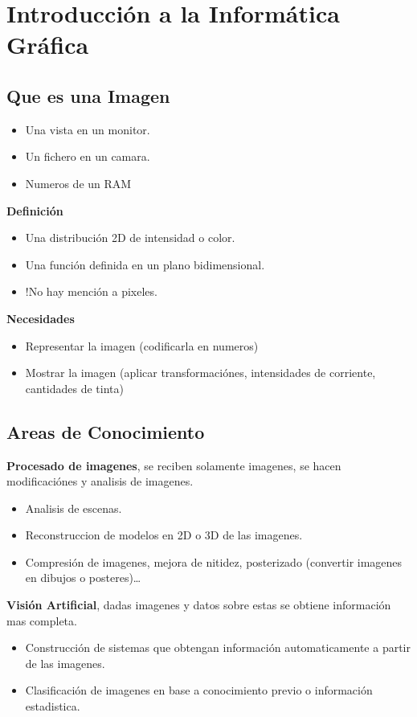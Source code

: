 \chapter{Introducción a la Informática Gráfica}\label{ch:introduccion-a-la-informática-gráfica}
\section{Que es una Imagen}
\begin{itemize}
  \item Una vista en un monitor.
  \item Un fichero en un camara.
  \item Numeros de un RAM
\end{itemize}
\textbf{Definición}
\begin{itemize}
  \item Una distribución 2D de intensidad o color.
  \item Una función definida en un plano bidimensional.
  \item !No hay mención a pixeles.
\end{itemize}
\textbf{Necesidades}
\begin{itemize}
  \item Representar la imagen (codificarla en numeros)
  \item Mostrar la imagen (aplicar transformaciónes, intensidades de corriente, cantidades de tinta)
\end{itemize}

  \section{Areas de Conocimiento}
  \textbf{Procesado de imagenes}, se reciben solamente imagenes, se hacen modificaciónes y analisis de imagenes.
\begin{itemize}
  \item Analisis de escenas.
  \item Reconstruccion de modelos en 2D o 3D de las imagenes.
  \item Compresión de imagenes, mejora de nitidez, posterizado (convertir imagenes en dibujos o posteres)\ldots
\end{itemize}

  \textbf{Visión Artificial}, dadas imagenes y datos sobre estas se obtiene información mas completa.
\begin{itemize}
  \item Construcción de sistemas que obtengan información automaticamente a partir de las imagenes.
  \item Clasificación de imagenes en base a conocimiento previo o información estadistica.
\end{itemize}

